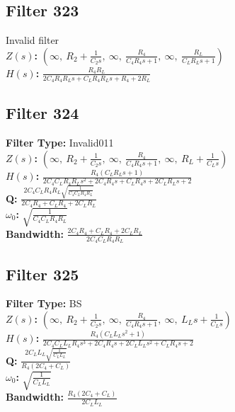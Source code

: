 \documentclass{article}
\begin{document}
\subsection*{Filter 323}
Invalid filter \\ 
\textbf{$Z(s)$:} $\left( \infty, \  R_{2} + \frac{1}{C_{2} s}, \  \infty, \  \frac{R_{4}}{C_{4} R_{4} s + 1}, \  \infty, \  \frac{R_{L}}{C_{L} R_{L} s + 1}\right)$ \\ 
\textbf{$H(s)$:} $\frac{R_{4} R_{L}}{2 C_{4} R_{4} R_{L} s + C_{L} R_{4} R_{L} s + R_{4} + 2 R_{L}}$ \\ 
\subsection*{Filter 324}
\textbf{Filter Type:} Invalid011 \\ 
\textbf{$Z(s)$:} $\left( \infty, \  R_{2} + \frac{1}{C_{2} s}, \  \infty, \  \frac{R_{4}}{C_{4} R_{4} s + 1}, \  \infty, \  R_{L} + \frac{1}{C_{L} s}\right)$ \\ 
\textbf{$H(s)$:} $\frac{R_{4} \left(C_{L} R_{L} s + 1\right)}{2 C_{4} C_{L} R_{4} R_{L} s^{2} + 2 C_{4} R_{4} s + C_{L} R_{4} s + 2 C_{L} R_{L} s + 2}$ \\ 
\textbf{Q:} $\frac{2 C_{4} C_{L} R_{4} R_{L} \sqrt{\frac{1}{C_{4} C_{L} R_{4} R_{L}}}}{2 C_{4} R_{4} + C_{L} R_{4} + 2 C_{L} R_{L}}$ \\ 
\textbf{$\omega_0$:} $\sqrt{\frac{1}{C_{4} C_{L} R_{4} R_{L}}}$ \\ 
\textbf{Bandwidth:} $\frac{2 C_{4} R_{4} + C_{L} R_{4} + 2 C_{L} R_{L}}{2 C_{4} C_{L} R_{4} R_{L}}$ \\ 
\subsection*{Filter 325}
\textbf{Filter Type:} BS \\ 
\textbf{$Z(s)$:} $\left( \infty, \  R_{2} + \frac{1}{C_{2} s}, \  \infty, \  \frac{R_{4}}{C_{4} R_{4} s + 1}, \  \infty, \  L_{L} s + \frac{1}{C_{L} s}\right)$ \\ 
\textbf{$H(s)$:} $\frac{R_{4} \left(C_{L} L_{L} s^{2} + 1\right)}{2 C_{4} C_{L} L_{L} R_{4} s^{3} + 2 C_{4} R_{4} s + 2 C_{L} L_{L} s^{2} + C_{L} R_{4} s + 2}$ \\ 
\textbf{Q:} $\frac{2 C_{L} L_{L} \sqrt{\frac{1}{C_{L} L_{L}}}}{R_{4} \left(2 C_{4} + C_{L}\right)}$ \\ 
\textbf{$\omega_0$:} $\sqrt{\frac{1}{C_{L} L_{L}}}$ \\ 
\textbf{Bandwidth:} $\frac{R_{4} \left(2 C_{4} + C_{L}\right)}{2 C_{L} L_{L}}$ \\ 
\end{document}
